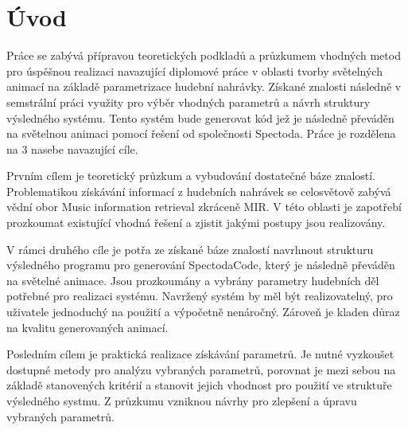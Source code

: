 \chapter*{Úvod}
{}

Práce se zabývá přípravou teoretických podkladů a průzkumem vhodných metod pro úspěšnou realizaci navazující diplomové práce v oblasti tvorby světelných animací na základě parametrizace hudební nahrávky. Získané znalosti následně v semstrální práci využity pro výběr vhodných parametrů a návrh struktury výsledného systému. Tento systém bude generovat kód jež je následně převáděn na světelnou animaci pomocí řešení od společnosti Spectoda. Práce je rozdělena na 3 nasebe navazující cíle.

Prvním cílem je teoretický průzkum a vybudování dostatečné báze znalostí. Problematikou získávání informací z hudebních nahrávek se celosvětově zabývá vědní obor Music information retrieval zkráceně \acs{MIR}. V této oblasti je zapotřebí prozkoumat existující vhodná řešení a zjistit jakými postupy jsou realizovány. 

V rámci druhého cíle je potřa ze získané báze znalostí navrhnout strukturu výsledného programu pro generování SpectodaCode, který je následně převáděn na světelné animace. Jsou prozkoumány a vybrány parametry hudebních děl potřebné pro realizaci systému. Navržený systém by měl být realizovatelný, pro uživatele jednoduchý na použití a výpočetně nenáročný. Zároveň je kladen důraz na kvalitu generovaných animací.  

Posledním cílem je praktická realizace získávání parametrů. Je nutné vyzkoušet dostupné metody pro analýzu vybraných parametrů, porovnat je mezi sebou na základě stanovených kritérií a stanovit jejich vhodnost pro použití ve struktuře výsledného systmu. Z průzkumu vzniknou návrhy pro zlepšení a úpravu vybraných parametrů. 





